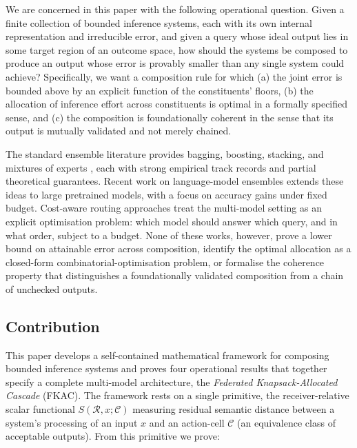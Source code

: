 \documentclass[11pt,twocolumn,a4paper]{article}
\theoremstyle{definition}
\theoremstyle{remark}
\newcommand{\Cell}{\mathcal{C}}
\newcommand{\receiver}{\mathcal{R}}
\newcommand{\Sscalar}{S}
\begin{document}
We are concerned in this paper with the following operational question. Given a finite collection of bounded inference systems, each with its own internal representation and irreducible error, and given a query whose ideal output lies in some target region of an outcome space, how should the systems be composed to produce an output whose error is provably smaller than any single system could achieve? Specifically, we want a composition rule for which (a) the joint error is bounded above by an explicit function of the constituents' floors, (b) the allocation of inference effort across constituents is optimal in a formally specified sense, and (c) the composition is foundationally coherent in the sense that its output is mutually validated and not merely chained.

The standard ensemble literature \citep{dietterich2000ensemble,breiman2001random,freund1997decision,wolpert1992stacked} provides bagging, boosting, stacking, and mixtures of experts \citep{jacobs1991adaptive,shazeer2017outrageously,fedus2022switch}, each with strong empirical track records and partial theoretical guarantees. Recent work on language-model ensembles \citep{wang2022self,du2023improving,jiang2023llm,wang2024mixture} extends these ideas to large pretrained models, with a focus on accuracy gains under fixed budget. Cost-aware routing approaches \citep{chen2023frugalgpt,sakota2024fly,lu2024merge,ong2024routellm,liu2024routerbench,aggarwal2024automix,naik2024diversity} treat the multi-model setting as an explicit optimisation problem: which model should answer which query, and in what order, subject to a budget. None of these works, however, prove a lower bound on attainable error across composition, identify the optimal allocation as a closed-form combinatorial-optimisation problem, or formalise the coherence property that distinguishes a foundationally validated composition from a chain of unchecked outputs.

\subsection{Contribution}

This paper develops a self-contained mathematical framework for composing bounded inference systems and proves four operational results that together specify a complete multi-model architecture, the \emph{Federated Knapsack-Allocated Cascade} (FKAC). The framework rests on a single primitive, the receiver-relative scalar functional $\Sscalar(\receiver, x; \Cell)$ measuring residual semantic distance between a system's processing of an input $x$ and an action-cell $\Cell$ (an equivalence class of acceptable outputs). From this primitive we prove:
\end{document}
